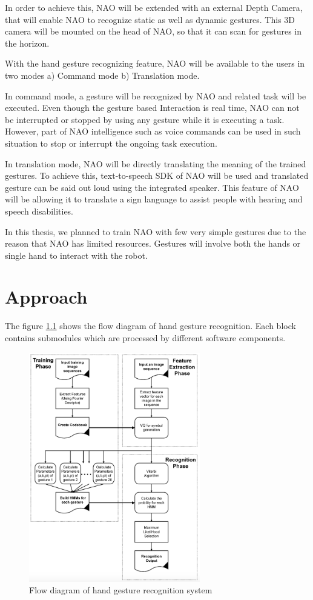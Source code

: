 In order to achieve this, NAO will be extended with an external Depth Camera, that will enable NAO to recognize static as well as dynamic gestures. This 3D camera will be mounted on the head of NAO, so that it can scan for gestures in the horizon. 

With the hand gesture recognizing feature, NAO will be available to the users in two modes a) Command mode b) Translation mode.

In command mode, a gesture will be recognized by NAO and related task will be executed. Even though the gesture based Interaction is real time, NAO can not be interrupted or stopped by using any gesture while it is executing a task. However, part of NAO intelligence such as voice commands can be used in such situation to stop or interrupt the ongoing task execution.

In translation mode, NAO will be directly translating the meaning of the trained gestures. To achieve this, text-to-speech SDK of NAO will be used and translated gesture can be said out loud using the integrated speaker. This feature of NAO will be allowing it to translate a sign language to assist people with hearing and speech disabilities.

In this thesis, we planned to train NAO with few very simple gestures due to the reason that NAO has limited resources. Gestures will involve both the hands or single hand to interact with the robot.

\chapter{Approach} The figure \ref{fig:flow} shows the flow diagram of hand gesture recognition. Each block contains submodules which are processed by different software components.
\begin{figure}
	[h] \centering 
	\includegraphics[height=10cm]{figures/flow.png} \caption{Flow diagram of hand gesture recognition system} \label{fig:flow} 
\end{figure}


